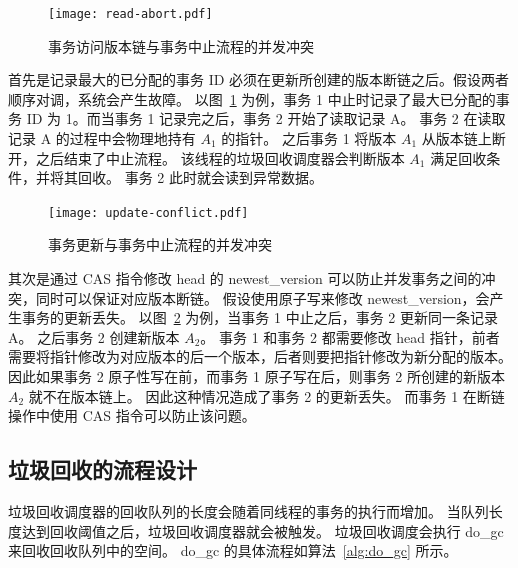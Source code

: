 \begin{figure}
    \centering
    \texttt{[image: read-abort.pdf]}
    \caption{事务访问版本链与事务中止流程的并发冲突}
    \label{fig:update-abort-read}
\end{figure}

首先是记录最大的已分配的事务 ID 必须在更新所创建的版本断链之后。假设两者顺序对调，系统会产生故障。
以图~\ref{fig:update-abort-read} 为例，事务 1 中止时记录了最大已分配的事务 ID 为 1。而当事务 1 记录完之后，事务 2 开始了读取记录 A。
事务 2 在读取记录 A 的过程中会物理地持有 $A_1$ 的指针。
之后事务 1 将版本 $A_1$ 从版本链上断开，之后结束了中止流程。
该线程的垃圾回收调度器会判断版本 $A_1$ 满足回收条件，并将其回收。
事务 2 此时就会读到异常数据。

\begin{figure}
    \centering
    \texttt{[image: update-conflict.pdf]}
    \caption{事务更新与事务中止流程的并发冲突}
    \label{fig:update-abort-update}
\end{figure}

其次是通过 CAS 指令修改 head 的 newest\_version 可以防止并发事务之间的冲突，同时可以保证对应版本断链。
假设使用原子写来修改 newest\_version，会产生事务的更新丢失。
以图~\ref{fig:update-abort-update} 为例，当事务 1 中止之后，事务 2 更新同一条记录 A。
之后事务 2 创建新版本 $A_2$。
事务 1 和事务 2 都需要修改 head 指针，前者需要将指针修改为对应版本的后一个版本，后者则要把指针修改为新分配的版本。
因此如果事务 2 原子性写在前，而事务 1 原子写在后，则事务 2 所创建的新版本 $A_2$ 就不在版本链上。
因此这种情况造成了事务 2 的更新丢失。
而事务 1 在断链操作中使用 CAS 指令可以防止该问题。





\subsection{垃圾回收的流程设计}
\label{ssec:gc-implement}

垃圾回收调度器的回收队列的长度会随着同线程的事务的执行而增加。
当队列长度达到回收阈值之后，垃圾回收调度器就会被触发。
垃圾回收调度会执行 do\_gc 来回收回收队列中的空间。
do\_gc 的具体流程如算法~\ref{alg:do_gc} 所示。

